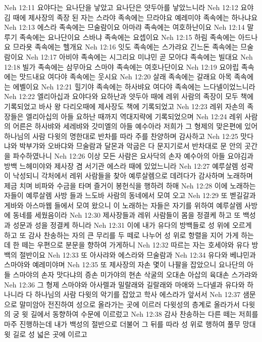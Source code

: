 Neh 12:11  요야다는 요나단을 낳았고 요나단은 얏두아를 낳았느니라
Neh 12:12  요야김 때에 제사장의 족장 된 자는 스라야 족속에는 므라야요 예레미야 족속에는 하나냐요
Neh 12:13  에스라 족속에는 므술람이요 아마랴 족속에는 여호하난이요
Neh 12:14  말루기 족속에는 요나단이요 스바냐 족속에는 요셉이요
Neh 12:15  하림 족속에는 아드나요 므라욧 족속에는 헬개요
Neh 12:16  잇도 족속에는 스가랴요 긴느돈 족속에는 므술람이요
Neh 12:17  아비야 족속에는 시그리요 미냐민 곧 모아댜 족속에는 빌대요
Neh 12:18  빌가 족속에는 삼무아요 스마야 족속에는 여호나단이요
Neh 12:19  요야립 족속에는 맛드내요 여다야 족속에는 웃시요
Neh 12:20  살래 족속에는 갈래요 아목 족속에는 에벨이요
Neh 12:21  힐기야 족속에는 하사뱌요 여다야 족속에는 느다넬이었느니라
Neh 12:22  엘리아십과 요야다와 요하난과 얏두아 때에 레위 사람의 족장이 모두 책에 기록되었고 바사 왕 다리오때에 제사장도 책에 기록되었고
Neh 12:23  레위 자손의 족장들은 엘리아십의 아들 요하난 때까지 역대지략에 기록되었으며
Neh 12:24  레위 사람의 어른은 하사뱌와 세레뱌와 갓미엘의 아들 예수아라 저희가 그 형제의 맞은편에 있어 하나님의 사람 다윗의 명한대로 반차를 따라 주를 찬양하며 감사하고
Neh 12:25  맛다냐와 박부갸와 오바댜와 므술람과 달몬과 악굽은 다 문지기로서 반차대로 문 안의 곳간을 파수하였나니
Neh 12:26  이상 모든 사람은 요사닥의 손자 예수아의 아들 요야김과 방백 느헤미야와 제사장 겸 서기관 에스라 때에 있었느니라
Neh 12:27  예루살렘 성곽이 낙성되니 각처에서 레위 사람들을 찾아 예루살렘으로 데려다가 감사하며 노래하며 제금 치며 비파와 수금을 타며 즐거이 봉헌식을 행하려 하매
Neh 12:28  이에 노래하는 자들이 예루살렘 사방 들과 느도바 사람의 동네에서 모여 오고
Neh 12:29  또 벧길갈과 게바와 아스마웹 들에서 모여 왔으니 이 노래하는 자들은 자기를 위하여 예루살렘 사방에 동네를 세웠음이라
Neh 12:30  제사장들과 레위 사람들이 몸을 정결케 하고 또 백성과 성문과 성을 정결케 하니라
Neh 12:31  이에 내가 유다의 방백들로 성 위에 오르게 하고 또 감사 찬송하는 자의 큰 무리를 두 떼로 나누어 성 위로 항렬을 지어 가게 하는데 한 떼는 우편으로 분문을 향하여 가게하니
Neh 12:32  따르는 자는 호세야와 유다 방백의 절반이요
Neh 12:33  또 아사랴와 에스라와 므술람과
Neh 12:34  유다와 베냐민과 스마야와 예레미야며
Neh 12:35  또 제사장의 자손 몇이 나팔을 잡았으니 요나단의 아들 스마야의 손자 맛다냐의 증손 미가야의 현손 삭굴의 오대손 아삽의 육대손 스가랴와
Neh 12:36  그 형제 스마야와 아사렐과 밀랄래와 길랄래와 마애와 느다넬과 유다와 하나니라 다 하나님의 사람 다윗의 악기를 잡았고 학사 에스라가 앞서서
Neh 12:37  샘문으로 말미암아 전진하여 성으로 올라가는 곳에 이르러 다윗성의 층계로 올라가서 다윗의 궁 윗 길에서 동향하여 수문에 이르렀고
Neh 12:38  감사 찬송하는 다른 떼는 저희를 마주 진행하는데 내가 백성의 절반으로 더불어 그 뒤를 따라 성 위로 행하여 풀무 망대 윗 길로 성 넓은 곳에 이르고
